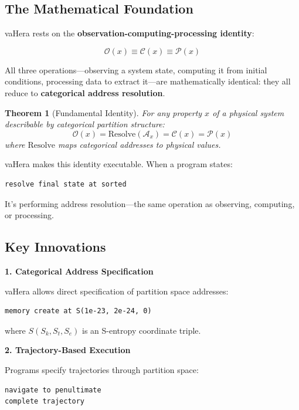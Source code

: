 \documentclass[twocolumn,10pt]{article}
\newcommand{\cataddr}{\mathcal{A}}
\newtheorem{theorem}{Theorem}[section]
\theoremstyle{definition}
\theoremstyle{remark}
\begin{document}
\subsection{The Mathematical Foundation}

vaHera rests on the \textbf{observation-computing-processing identity}:

\begin{equation}
\boxed{\mathcal{O}(x) \equiv \mathcal{C}(x) \equiv \mathcal{P}(x)}
\label{eq:fundamental}
\end{equation}

All three operations—observing a system state, computing it from initial conditions, processing data to extract it—are mathematically identical: they all reduce to \textbf{categorical address resolution}.

\begin{theorem}[Fundamental Identity]
For any property $x$ of a physical system describable by categorical partition structure:
\begin{equation}
    \mathcal{O}(x) = \text{Resolve}(\cataddr_x) = \mathcal{C}(x) = \mathcal{P}(x)
\end{equation}
where $\text{Resolve}$ maps categorical addresses to physical values.
\end{theorem}

vaHera makes this identity executable. When a program states:
\begin{lstlisting}
resolve final state at sorted
\end{lstlisting}

It's performing address resolution—the same operation as observing, computing, or processing.

\subsection{Key Innovations}

\textbf{1. Categorical Address Specification}

vaHera allows direct specification of partition space addresses:
\begin{lstlisting}
memory create at S(1e-23, 2e-24, 0)
\end{lstlisting}

where $S(S_k, S_t, S_e)$ is an S-entropy coordinate triple.

\textbf{2. Trajectory-Based Execution}

Programs specify trajectories through partition space:
\begin{lstlisting}
navigate to penultimate
complete trajectory
\end{lstlisting}
\end{document}
